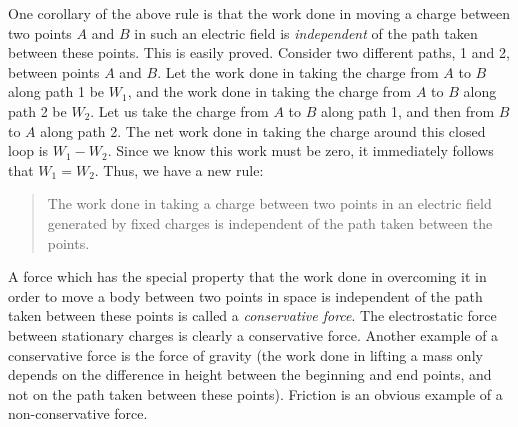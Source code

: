 One  corollary of the above rule is that the work done in moving  a
charge between two points $A$ and $B$ in such an electric field is {\em independent}
of the path taken between these points. This is easily proved. Consider
 two different paths, 1 and 2, between points $A$ and $B$.
 Let the work done in taking the charge from $A$ to $B$ along
path 1 be $W_1$, and the work done in taking the charge from $A$ to $B$ along
path 2 be $W_2$. Let us  take the charge
from $A$ to $B$ along path 1, and then from $B$ to $A$ along path 2. The net
work done in taking the charge around this closed loop is $W_1-W_2$. 
Since we know this work must be zero, it immediately follows that $W_1=W_2$. Thus,
we have a new rule:
\begin{quote}
{\sf The work done in taking a charge between two points in an electric field
generated by fixed charges is independent of the path taken between the points.}
\end{quote}

A force which has the special property that the work done in overcoming it
in order to move a body between two points in space is independent of the
path taken between these points is called a {\em conservative force}. 
The electrostatic force between stationary charges is clearly a
conservative force. Another example of a conservative force is the force
of gravity (the work done in lifting a mass only depends on the difference
in height between the beginning and end points, and not on the path
taken between these points). Friction is an obvious example of a non-conservative
force. 

